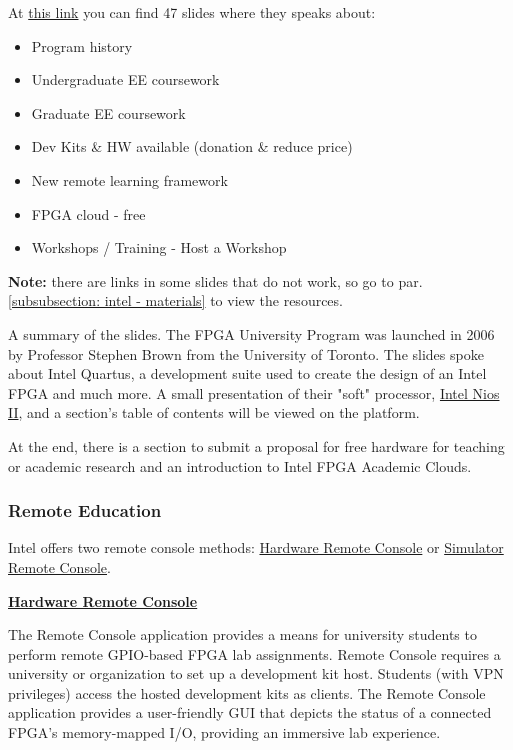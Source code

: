 \documentclass[a4paper]{article}
\begin{document}
    At \href{https://cdrdv2.intel.com/v1/dl/getContent/685254}{this link} you can find 47 slides where they speaks about:
    \begin{itemize}
        \item Program history
        \item Undergraduate EE coursework
        \item Graduate EE coursework
        \item Dev Kits \& HW available (donation \& reduce price)
        \item New remote learning framework
        \item FPGA cloud - free
        \item Workshops / Training - Host a Workshop
    \end{itemize}
    \textbf{Note:} there are links in some slides that do not work, so go to par. \ref{subsubsection: intel - materials} to view the resources.\newline

    \noindent
    A summary of the slides. The FPGA University Program was launched in 2006 by Professor Stephen Brown from the University of Toronto. The slides spoke about Intel Quartus, a development suite used to create the design of an Intel FPGA and much more. A small presentation of their "soft" processor, \href{https://ftp.intel.com/Public/Pub/fpgaup/pub/Teaching_Materials/current/Tutorials/Nios2_introduction.pdf}{Intel Nios II}, and a section's table of contents will be viewed on the platform.

    At the end, there is a section to submit a proposal for free hardware for teaching or academic research and an introduction to Intel FPGA Academic Clouds.\newpage

    \subsubsection{Remote Education}

    Intel offers two remote console methods: \href{https://github.com/intel/FPGA-Devcloud/tree/master/main/HandsFree}{Hardware Remote Console} or \href{https://github.com/fpgacademy/DESim}{Simulator Remote Console}.

    \begin{flushleft}
        \textbf{\underline{Hardware Remote Console}}
    \end{flushleft}
    The Remote Console application provides a means for university students to perform remote GPIO-based FPGA lab assignments. Remote Console requires a university or organization to set up a development kit host. Students (with VPN privileges) access the hosted development kits as clients. The Remote Console application provides a user-friendly GUI that depicts the status of a connected FPGA's memory-mapped I/O, providing an immersive lab experience.\newline
\end{document}
